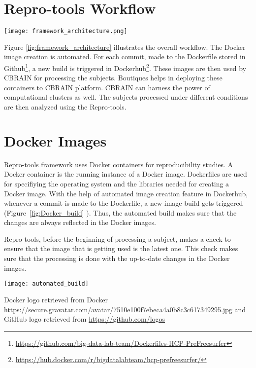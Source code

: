 \section{Repro-tools Workflow}\label{workflow}
\begin{center}
\texttt{[image: framework\_architecture.png]}
\label{fig:framework_architecture}
\end{center}
\vskip 0.2in

Figure \ref{fig:framework_architecture} illustrates the overall workflow. The Docker image creation is automated. For each commit, made to the Dockerfile stored in Github\footnote{\url{https://github.com/big-data-lab-team/Dockerfiles-HCP-PreFreesurfer}}, a new build is triggered in Dockerhub\footnote{\url{https://hub.docker.com/r/bigdatalabteam/hcp-prefreesurfer/}}. These images are then used by CBRAIN for processing the subjects. Boutiques helps in deploying these containers to CBRAIN platform. CBRAIN can harness the power of computational clusters as well. The subjects processed under different conditions are then analyzed using the Repro-tools.

\section{Docker Images}\label{docker_images}
Repro-tools framework uses Docker containers for reproducibility 
studies. A Docker container is the running instance of a Docker image. 
Dockerfiles are used for specifiying the operating system and the 
libraries needed for creating a Docker image. With the help of 
automated image creation feature in Dockerhub, whenever a commit is 
made to the Dockerfile, a new image build gets triggered 
(Figure~\ref{fig:Docker_build} ). Thus, the automated build makes sure that the changes are 
always reflected in the Docker images.

Repro-tools, before the beginning of processing a subject, makes a check to ensure that the image that is getting used is the latest one. This check makes sure that the processing is done with the up-to-date changes in the Docker images.

\begin{center}
  \texttt{[image: automated\_build]}
  \label{fig:Docker_build}
  \caption*{Docker logo retrieved from Docker \url{https://secure.gravatar.com/avatar/7510e100f7ebeca4a0b8c3c617349295.jpg} and GitHub logo retrieved from \url{https://github.com/logos}}
\end{center}

